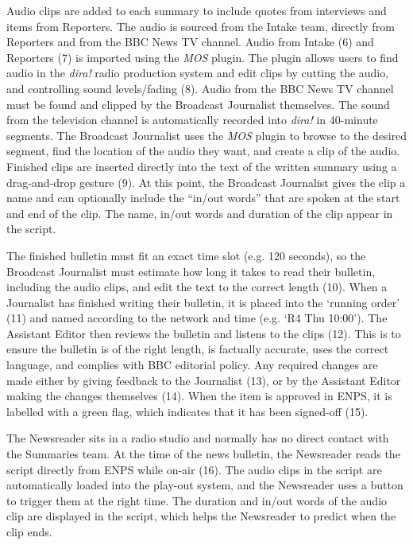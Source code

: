 Audio clips are added to each summary to include quotes from interviews and items from Reporters. The audio is sourced
from the Intake team, directly from Reporters and from the BBC News TV channel. Audio from Intake (6) and Reporters (7) is
imported using the \textit{MOS} plugin. The plugin allows users to find audio in the \textit{dira!} radio production
system and edit clips by cutting the audio, and controlling sound levels/fading (8).  Audio from the BBC News TV
channel must be found and clipped by the Broadcast Journalist themselves. The sound from the television channel is
automatically recorded into \textit{dira!} in 40-minute segments. The Broadcast Journalist uses the \textit{MOS} plugin
to browse to the desired segment, find the location of the audio they want, and create a clip of the audio.  Finished
clips are inserted directly into the text of the written summary using a drag-and-drop gesture (9). At this point, the
Broadcast Journalist gives the clip a name and can optionally include the ``in/out words'' that are spoken at the start
and end of the clip.  The name, in/out words and duration of the clip appear in the script.

The finished bulletin must fit an exact time slot (e.g. 120 seconds), so the Broadcast Journalist must estimate how
long it takes to read their bulletin, including the audio clips, and edit the text to the correct length (10).  When a
Journalist has finished writing their bulletin, it is placed into the `running order' (11) and named according to the
network and time (e.g. `R4 Thu 10:00').  The Assistant Editor then reviews the bulletin and listens to the clips (12). This
is to ensure the bulletin is of the right length, is factually accurate, uses the correct language, and complies with
BBC editorial policy. Any required changes are made either by giving feedback to the Journalist (13), or by the Assistant
Editor making the changes themselves (14).  When the item is approved in ENPS, it is labelled with a green flag, which
indicates that it has been signed-off (15).

The Newsreader sits in a radio studio and normally has no direct contact with the Summaries team.  At the time of the
news bulletin, the Newsreader reads the script directly from ENPS while on-air (16). The audio clips in the script are
automatically loaded into the play-out system, and the Newsreader uses a button to trigger them at the right time.  The
duration and in/out words of the audio clip are displayed in the script, which helps the Newsreader to predict when the
clip ends.

